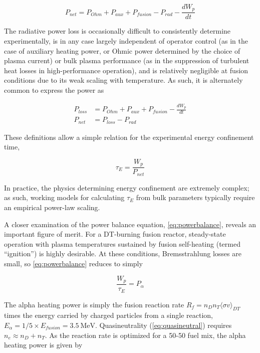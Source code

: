 \begin{equation}\label{eq:pnet}
 P_{net} = P_{Ohm} + P_{aux} + P_{fusion} - P_{rad} - \frac{dW_p}{dt}
\end{equation}

\noindent The radiative power loss is occasionally difficult to consistently determine experimentally, is in any case largely independent of operator control (as in the case of auxiliary heating power, or Ohmic power determined by the choice of plasma current) or bulk plasma performance (as in the suppression of turbulent heat losses in high-performance operation), and is relatively negligible at fusion conditions due to its weak scaling with temperature.  As such, it is alternately common to express the power as

\begin{equation}\label{eq:ploss}
 \begin{aligned}
 P_{loss} &= P_{Ohm} + P_{aux} + P_{fusion} - \frac{dW_p}{dt} \\
 P_{net} &= P_{loss} - P_{rad}
 \end{aligned}
\end{equation}

\noindent These definitions allow a simple relation for the experimental energy confinement time,

\begin{equation}\label{eq:tauE}
 \tau_E = \frac{W_p}{P_{net}}
\end{equation}

\noindent In practice, the physics determining energy confinement are extremely complex; as such, working models for calculating $\tau_E$ from bulk parameters typically require an empirical power-law scaling.

A closer examination of the power balance equation, \cref{eq:powerbalance}, reveals an important figure of merit.  For a DT-burning fusion reactor, steady-state operation with plasma temperatures sustained by fusion self-heating (termed ``ignition'') is highly desirable.  At these conditions, Bremsstrahlung losses are small, so \cref{eq:powerbalance} reduces to simply

\begin{equation}\label{eq:powerbalance2}
 \frac{W_p}{\tau_E} = P_{\alpha}
\end{equation}

\noindent The alpha heating power is simply the fusion reaction rate $R_f = n_D n_T \langle \sigma v \rangle_{DT}$ times the energy carried by charged particles from a single reaction, $E_\alpha = 1/5 \times E_{fusion} = \SI{3.5}{\mega\electronvolt}$.  Quasineutrality (\cref{eq:quasineutral}) requires $n_e \approx n_D + n_T$.  As the reaction rate is optimized for a 50-50 fuel mix, the alpha heating power is given by

